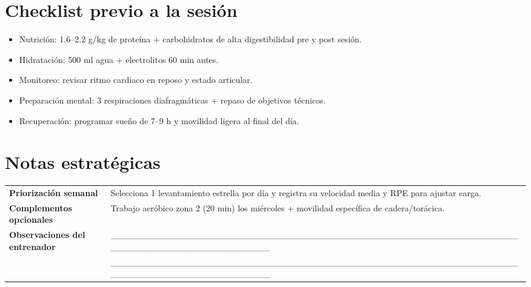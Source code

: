 \documentclass[12pt]{article}
\newcommand{\checkitem}{\textcolor{secondary}{\ding{52}}}
\begin{document}
\section*{Checklist previo a la sesión}
\begin{itemize}[leftmargin=2.2em]
  \item[\checkitem] Nutrición: 1.6--2.2 g/kg de proteína + carbohidratos de alta digestibilidad pre y post sesión.
  \item[\checkitem] Hidratación: 500 ml agua + electrolitos 60 min antes.
  \item[\checkitem] Monitoreo: revisar ritmo cardiaco en reposo y estado articular.
  \item[\checkitem] Preparación mental: 3 respiraciones diafragmáticas + repaso de objetivos técnicos.
  \item[\checkitem] Recuperación: programar sueño de 7--9 h y movilidad ligera al final del día.
\end{itemize}

\section*{Notas estratégicas}
\begin{tabularx}{\linewidth}{>{\bfseries\color{primary}}lY}
  Priorización semanal & Selecciona 1 levantamiento estrella por día y registra su velocidad media y RPE para ajustar carga.\\
  Complementos opcionales & Trabajo aeróbico zona 2 (20 min) los miércoles + movilidad específica de cadera/torácica.\\
  Observaciones del entrenador & _________________________________________________________________________________________\\
   & _________________________________________________________________________________________\\
\end{tabularx}

\vfill
{}
\end{document}
